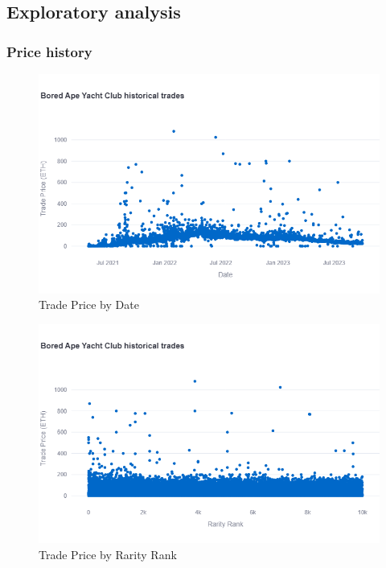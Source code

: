 \documentclass[12pt]{article}
\begin{document}
\subsection{Exploratory analysis}

\subsubsection{Price history}
\begin{figure}[H]
    \includegraphics[width=\textwidth]{../figures/price_date.png}
    \caption{Trade Price by Date}
\end{figure}

\begin{figure}[H]
    \includegraphics[width=\textwidth]{../figures/price_rarity.png}
    \caption{Trade Price by Rarity Rank}
\end{figure}
\end{document}
